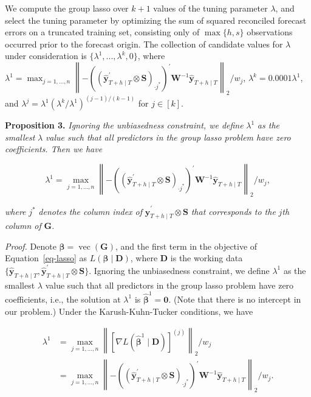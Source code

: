 \documentclass[11pt,a4paper,]{article}
\begin{document}
We compute the group lasso over \(k+1\) values of the tuning parameter
\(\lambda\), and select the tuning parameter by optimizing the sum of
squared reconciled forecast errors on a truncated training set,
consisting only of \(\max\{h, s\}\) observations occurred prior to the
forecast origin. The collection of candidate values for \(\lambda\)
under consideration is \(\{\lambda^{1},...,\lambda^{k}, 0\}\), where
\(\lambda^{1} = \max _{j=1, \ldots, n}\left\|-\left(\left(\hat{\boldsymbol{y}}_{T+h \mid T}^{\prime} \otimes \boldsymbol{S}\right)_{\cdot j^{*}}\right)^{\prime} \boldsymbol{W}^{-1} \hat{\boldsymbol{y}}_{T+h \mid T}\right\|_2 / w_j\),
\(\lambda^{k} = 0.0001\lambda^{1}\), and
\(\lambda^{j} = \lambda^{1}\left(\lambda^{k} / \lambda^{1}\right)^{(j-1) / (k-1)}\)
for \(j \in [k]\).

\textbf{Proposition 3.} \emph{Ignoring the unbiasedness constraint, we
define} \(\lambda^{1}\) \emph{as the smallest} \(\lambda\) \emph{value
such that all predictors in the group lasso problem have zero
coefficients. Then we have}

\[
\lambda^{1} = \max _{j=1, \ldots, n}\left\|-\left(\left(\hat{\boldsymbol{y}}_{T+h \mid T}^{\prime} \otimes \boldsymbol{S}\right)_{\cdot j^{*}}\right)^{\prime} \boldsymbol{W}^{-1} \hat{\boldsymbol{y}}_{T+h \mid T}\right\|_2 / w_j,
\]

\emph{where} \(j^{*}\) \emph{denotes the column index of}
\(\hat{\boldsymbol{y}}_{T+h \mid T}^{\prime} \otimes \boldsymbol{S}\)
\emph{that corresponds to the} \(j\)\emph{th column of}
\(\boldsymbol{G}\)\emph{.}

\emph{Proof.} Denote
\(\boldsymbol{\beta} = \operatorname{vec}(\boldsymbol{G})\), and the
first term in the objective of Equation~\ref{eq-lasso} as
\(L\left(\boldsymbol{\beta} \mid \boldsymbol{D}\right)\), where
\(\boldsymbol{D}\) is the working data
\(\{\hat{\boldsymbol{y}}_{T+h \mid T} , \hat{\boldsymbol{y}}_{T+h \mid T}^{\prime} \otimes \boldsymbol{S}\}\).
Ignoring the unbiasedness constraint, we define \(\lambda^{1}\) as the
smallest \(\lambda\) value such that all predictors in the group lasso
problem have zero coefficients, i.e., the solution at \(\lambda^{1}\) is
\(\hat{\boldsymbol{\beta}}^{1}=\boldsymbol{0}\). (Note that there is no
intercept in our problem.) Under the Karush-Kuhn-Tucker conditions, we
have

\[
\begin{aligned}
\lambda^{1} & = \max _{j=1, \ldots, n}\left\|\left[\nabla L\left(\hat{\boldsymbol{\beta}}^{1} \mid \mathbf{D}\right)\right]^{(j)}\right\|_2 / w_j \\
& = \max _{j=1, \ldots, n}\left\|-\left(\left(\hat{\boldsymbol{y}}_{T+h \mid T}^{\prime} \otimes \boldsymbol{S}\right)_{\cdot j^{*}}\right)^{\prime} \boldsymbol{W}^{-1} \hat{\boldsymbol{y}}_{T+h \mid T}\right\|_2 / w_j.
\end{aligned}
\]
\end{document}
